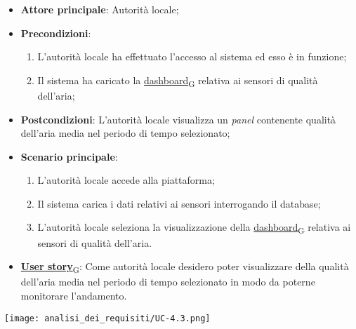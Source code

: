 \begin{itemize}
	\item \textbf{Attore principale}: Autorità locale;
	\item \textbf{Precondizioni}:
	      \begin{enumerate}
		      \item L'autorità locale ha effettuato l'accesso al sistema ed esso è in funzione;
		      \item Il sistema ha caricato la \href{https://7last.github.io/docs/rtb/documentazione-interna/glossario\#dashboard}{dashboard\textsubscript{G}} relativa ai sensori di qualità dell'aria;
	      \end{enumerate}
	\item \textbf{Postcondizioni}: L'autorità locale visualizza un \textit{panel} contenente qualità dell'aria media nel periodo di tempo selezionato;
	\item \textbf{Scenario principale}:
	      \begin{enumerate}
		      \item L'autorità locale accede alla piattaforma;
		      \item Il sistema carica i dati relativi ai sensori interrogando il database;
		      \item L'autorità locale seleziona la visualizzazione della \href{https://7last.github.io/docs/rtb/documentazione-interna/glossario\#dashboard}{dashboard\textsubscript{G}} relativa ai sensori di qualità dell'aria.
	      \end{enumerate}
	\item \href{https://7last.github.io/docs/rtb/documentazione-interna/glossario\#user-story}{\textbf{User story}\textsubscript{G}}: Come autorità locale desidero poter visualizzare della qualità dell'aria media nel periodo di tempo selezionato
	      in modo da poterne monitorare l'andamento.
\end{itemize}
\begin{center}
	\texttt{[image: analisi\_dei\_requisiti/UC-4.3.png]}
\end{center}

